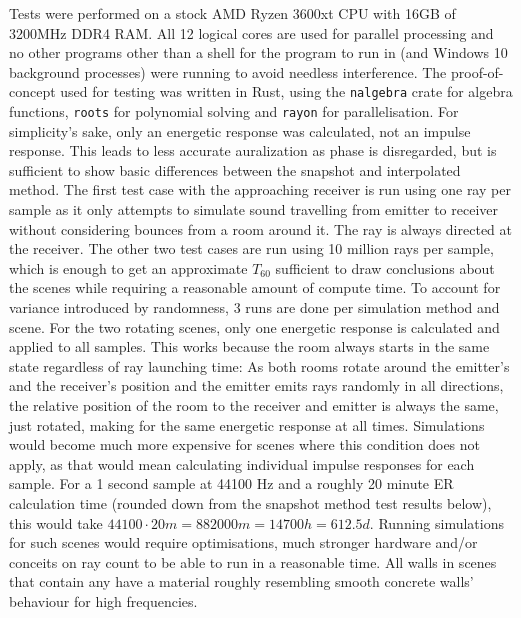 Tests were performed on a stock AMD Ryzen 3600xt CPU with 16GB of 3200MHz DDR4 RAM.
All 12 logical cores are used for parallel processing
and no other programs other than a shell for the program to run in (and Windows 10 background processes) were running to avoid needless interference.
\newline
The proof-of-concept used for testing was written in Rust, using the \verb|nalgebra| crate for algebra functions,
\verb|roots| for polynomial solving and \verb|rayon| for parallelisation.
For simplicity's sake, only an energetic response was calculated, not an impulse response.
This leads to less accurate auralization as phase is disregarded,
but is sufficient to show basic differences between the snapshot and interpolated method.
\newline
The first test case with the approaching receiver is run using one ray per sample
as it only attempts to simulate sound travelling from emitter to receiver
without considering bounces from a room around it.
The ray is always directed at the receiver.
\newline
The other two test cases are run using 10 million rays per sample,
which is enough to get an approximate \(T_{60}\) sufficient to draw conclusions about the scenes
while requiring a reasonable amount of compute time.
To account for variance introduced by randomness, 3 runs are done per simulation method and scene.
\newline
For the two rotating scenes, only one energetic response is calculated and applied to all samples.
This works because the room always starts in the same state regardless of ray launching time:
As both rooms rotate around the emitter's and the receiver's position
and the emitter emits rays randomly in all directions,
the relative position of the room to the receiver and emitter is always the same, just rotated,
making for the same energetic response at all times.
\newline
Simulations would become much more expensive for scenes where this condition does not apply,
as that would mean calculating individual impulse responses for each sample.
For a 1 second sample at 44100 Hz and a roughly 20 minute ER calculation time
(rounded down from the snapshot method test results below),
this would take \(44100 \cdot 20 m = 882000 m = 14700 h = 612.5 d\).
Running simulations for such scenes would require optimisations, much stronger hardware
and/or conceits on ray count to be able to run in a reasonable time.
\newline
All walls in scenes that contain any have a material roughly resembling smooth concrete walls' behaviour for high frequencies.
